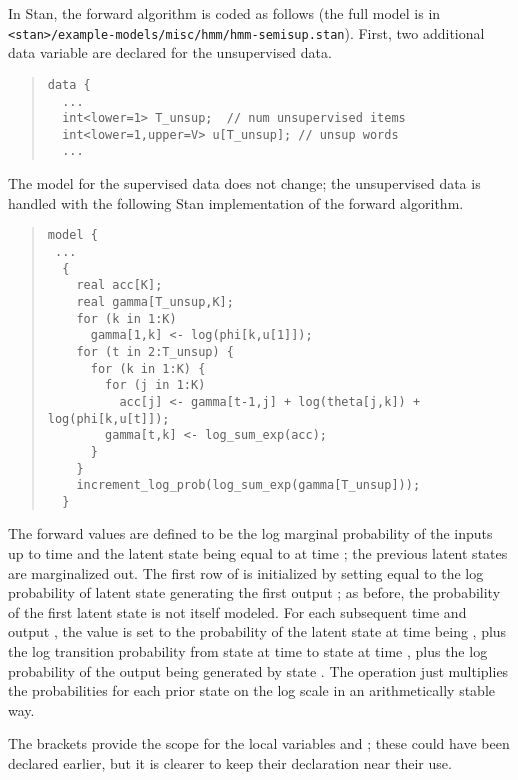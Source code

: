 In Stan, the forward algorithm is coded as follows (the full model
is in \nolinkurl{<stan>/example-models/misc/hmm/hmm-semisup.stan}).  First,
two additional data variable are declared for the unsupervised data.
%
\begin{quote}
\begin{Verbatim}[fontsize=\small]
data {
  ...
  int<lower=1> T_unsup;  // num unsupervised items
  int<lower=1,upper=V> u[T_unsup]; // unsup words
  ...
\end{Verbatim}
\end{quote}
%
The model for the supervised data does not change; the unsupervised
data is handled with the following Stan implementation of the forward
algorithm.  
%
\begin{quote}
\begin{Verbatim}[fontsize=\small]
model {
 ...
  { 
    real acc[K];
    real gamma[T_unsup,K];
    for (k in 1:K)
      gamma[1,k] <- log(phi[k,u[1]]);
    for (t in 2:T_unsup) {
      for (k in 1:K) {
        for (j in 1:K)
          acc[j] <- gamma[t-1,j] + log(theta[j,k]) + log(phi[k,u[t]]);
        gamma[t,k] <- log_sum_exp(acc);
      }
    }
    increment_log_prob(log_sum_exp(gamma[T_unsup]));
  }
\end{Verbatim}
\end{quote}
%
The forward values  are defined to be the log
marginal probability of the inputs  up to time
 and the latent state being equal to  at time
; the previous latent states are marginalized out.  The first
row of  is initialized by setting  equal
to the log probability of latent state  generating the first
output ; as before, the probability of the first latent
state is not itself modeled.  For each subsequent time  and
output , the value  is set to the probability of
the latent state at time  being , plus the log
transition probability from state  at time  to state
 at time , plus the log probability of the output
 being generated by state .  The
 operation just multiplies the probabilities for
each prior state  on the log scale in an arithmetically stable
way.

The brackets provide the scope for the local variables  and
; these could have been declared earlier, but it is
clearer to keep their declaration near their use. 


